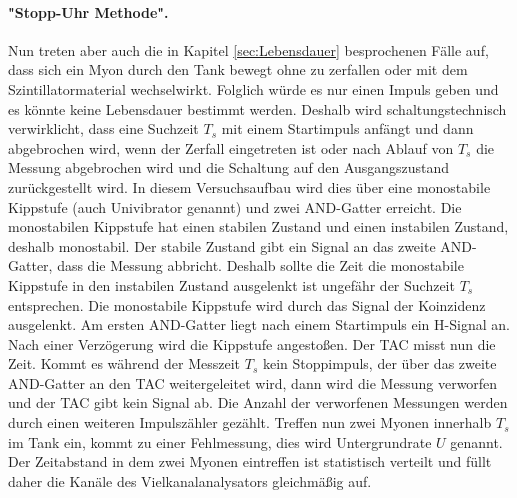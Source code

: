 \paragraph{"Stopp-Uhr Methode".}
Nun treten aber auch die in Kapitel 
\ref{sec:Lebensdauer} besprochenen Fälle auf, dass sich ein Myon durch den Tank bewegt ohne zu zerfallen oder mit 
dem Szintillatormaterial wechselwirkt. Folglich würde es nur einen Impuls geben und es könnte keine Lebensdauer 
bestimmt werden. Deshalb wird schaltungstechnisch verwirklicht, dass eine Suchzeit $T_s$ mit einem Startimpuls 
anfängt und dann abgebrochen wird, wenn der Zerfall eingetreten ist oder nach Ablauf von $T_s$ die Messung 
abgebrochen wird und die Schaltung auf den Ausgangszustand zurückgestellt wird. In diesem Versuchsaufbau wird 
dies über eine monostabile Kippstufe (auch Univibrator genannt) und zwei AND-Gatter erreicht. Die 
monostabilen Kippstufe hat einen stabilen Zustand und einen instabilen Zustand, deshalb 
monostabil. Der stabile Zustand gibt ein Signal an das zweite AND-Gatter, dass die Messung 
abbricht. Deshalb sollte die Zeit die monostabile Kippstufe in den instabilen Zustand ausgelenkt 
ist ungefähr der Suchzeit $T_s$ entsprechen. Die monostabile Kippstufe wird durch das Signal 
der Koinzidenz ausgelenkt. Am ersten AND-Gatter liegt nach einem Startimpuls ein H-Signal an. 
Nach einer Verzögerung wird die Kippstufe angestoßen. Der TAC misst nun die Zeit. Kommt es während der Messzeit 
$T_s$ kein Stoppimpuls, der über das zweite AND-Gatter an den TAC weitergeleitet wird, dann wird die Messung 
verworfen und der TAC gibt kein Signal ab. Die Anzahl der verworfenen Messungen werden durch einen 
weiteren Impulszähler gezählt. Treffen nun zwei Myonen innerhalb $T_s$ im Tank ein, 
kommt zu einer Fehlmessung, dies wird Untergrundrate $U$ genannt. Der Zeitabstand in dem zwei 
Myonen eintreffen ist statistisch verteilt und füllt daher die Kanäle des Vielkanalanalysators 
gleichmäßig auf. 

